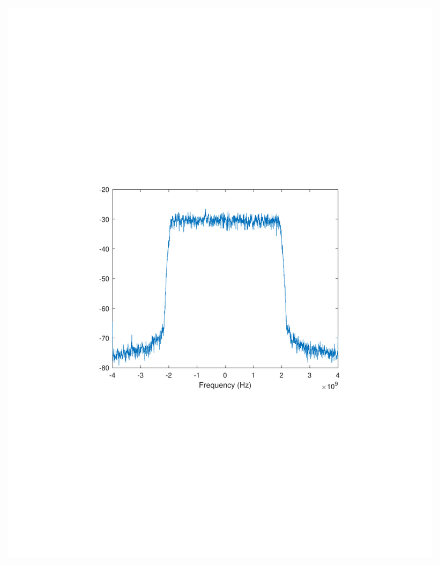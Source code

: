 \begin{refsection}
\begin{figure}[H]
	\centering
	\begin{minipage}{0.30\textwidth}
		\centering
		\includegraphics[clip, trim=4cm 8cm 4cm 8cm, width=1\textwidth]{./sdf/m_qam_system/figures/expResults/intradyne/6_4GBdInSig13dB_AfMIMO2.pdf}
		\label{fig:4GBdEyeMIMO2}
	\end{minipage}
	\begin{minipage}{0.30\textwidth}
		\centering

\end{minipage}
\end{figure}
\end{refsection}
